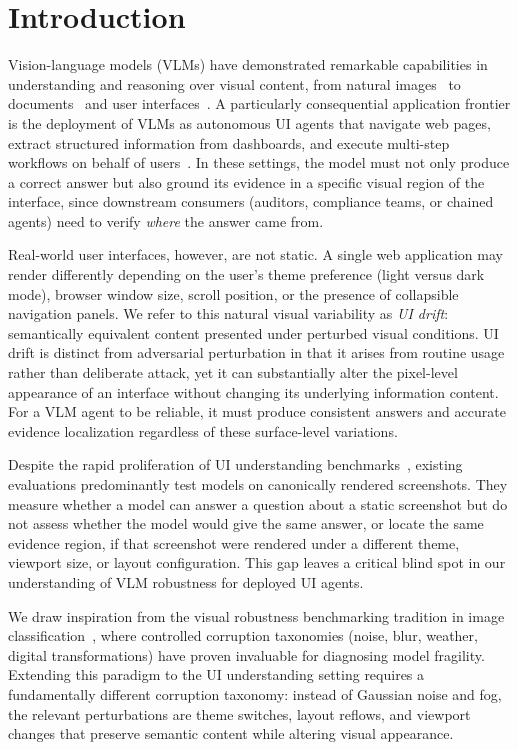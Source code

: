 \section{Introduction}
\label{sec:intro}

Vision-language models (VLMs) have demonstrated remarkable capabilities in understanding and reasoning over visual content, from natural images~\cite{radford2021clip,openai2023gpt4v} to documents~\cite{tang2023unifying} and user interfaces~\cite{you2024ferretui,hong2024cogagent}. A particularly consequential application frontier is the deployment of VLMs as autonomous UI agents that navigate web pages, extract structured information from dashboards, and execute multi-step workflows on behalf of users~\cite{zheng2024gpt4vision}. In these settings, the model must not only produce a correct answer but also ground its evidence in a specific visual region of the interface, since downstream consumers (auditors, compliance teams, or chained agents) need to verify \emph{where} the answer came from.

Real-world user interfaces, however, are not static. A single web application may render differently depending on the user's theme preference (light versus dark mode), browser window size, scroll position, or the presence of collapsible navigation panels. We refer to this natural visual variability as \emph{UI drift}: semantically equivalent content presented under perturbed visual conditions. UI drift is distinct from adversarial perturbation in that it arises from routine usage rather than deliberate attack, yet it can substantially alter the pixel-level appearance of an interface without changing its underlying information content. For a VLM agent to be reliable, it must produce consistent answers and accurate evidence localization regardless of these surface-level variations.

Despite the rapid proliferation of UI understanding benchmarks~\cite{liu2024visualwebbench,hsiao2022screenqa,chen2021websrc,baechler2024screenai}, existing evaluations predominantly test models on canonically rendered screenshots. They measure whether a model can answer a question about a static screenshot but do not assess whether the model would give the same answer, or locate the same evidence region, if that screenshot were rendered under a different theme, viewport size, or layout configuration. This gap leaves a critical blind spot in our understanding of VLM robustness for deployed UI agents.

We draw inspiration from the visual robustness benchmarking tradition in image classification~\cite{hendrycks2019imagenetc,hendrycks2019cifarc}, where controlled corruption taxonomies (noise, blur, weather, digital transformations) have proven invaluable for diagnosing model fragility. Extending this paradigm to the UI understanding setting requires a fundamentally different corruption taxonomy: instead of Gaussian noise and fog, the relevant perturbations are theme switches, layout reflows, and viewport changes that preserve semantic content while altering visual appearance.

